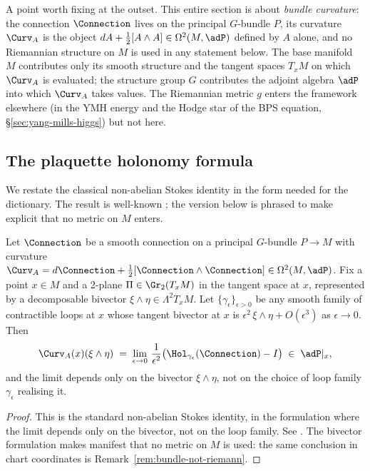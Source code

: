 A point worth fixing at the outset. This entire section is about
\emph{bundle curvature}: the connection $\Connection$ lives on the
principal $G$-bundle $P$, its curvature $\Curv_A$ is the object
$dA + \tfrac12[A\wedge A]\in\Omega^2(M,\adP)$ defined by $A$ alone,
and no Riemannian structure on $M$ is used in any statement below.
The base manifold $M$ contributes only its smooth structure and the
tangent spaces $T_xM$ on which $\Curv_A$ is evaluated; the structure
group $G$ contributes the adjoint algebra $\adP$ into which $\Curv_A$
takes values. The Riemannian metric $g$ enters the framework
elsewhere (in the YMH energy and the Hodge star of the BPS
equation, \S\ref{sec:yang-mills-higgs}) but not here.

\subsection{The plaquette holonomy formula}\label{ssec:plaquette}

We restate the classical non-abelian Stokes identity in the form
needed for the dictionary. The result is well-known
\cite{KobayashiNomizu,Wilson1974}; the version below is phrased to
make explicit that no metric on $M$ enters.

\begin{theorem}\label{thm:plaquette}
Let $\Connection$ be a smooth connection on a principal $G$-bundle
$P\to M$ with curvature
$\Curv_A = d\Connection + \tfrac12[\Connection\wedge\Connection]
\in\Omega^2(M,\adP)$. Fix a point $x\in M$ and a 2-plane
$\Pi\in\Gr_2(T_xM)$ in the tangent space at $x$, represented by a
decomposable bivector $\xi\wedge\eta\in\Lambda^2 T_xM$. Let
$\{\gamma_\epsilon\}_{\epsilon>0}$ be any smooth family of contractible
loops at $x$ whose tangent bivector at $x$ is
$\epsilon^2\,\xi\wedge\eta + O(\epsilon^3)$ as $\epsilon\to 0$. Then
\[
   \Curv_A(x)(\xi\wedge\eta) \;=\;
   \lim_{\epsilon\to 0}\,\frac{1}{\epsilon^2}
   \bigl(\Hol_{\gamma_\epsilon}(\Connection) - I\bigr)
   \;\in\; \adP|_x,
\]
and the limit depends only on the bivector $\xi\wedge\eta$, not on the
choice of loop family $\gamma_\epsilon$ realising it.
\end{theorem}

\begin{proof}
This is the standard non-abelian Stokes identity, in the
formulation where the limit depends only on the bivector, not on
the loop family. See \cite[Chapter~II]{KobayashiNomizu}. The
bivector formulation makes manifest that no metric on $M$ is used:
the same conclusion in chart coordinates is Remark~\ref{rem:bundle-not-riemann}.
\end{proof}


